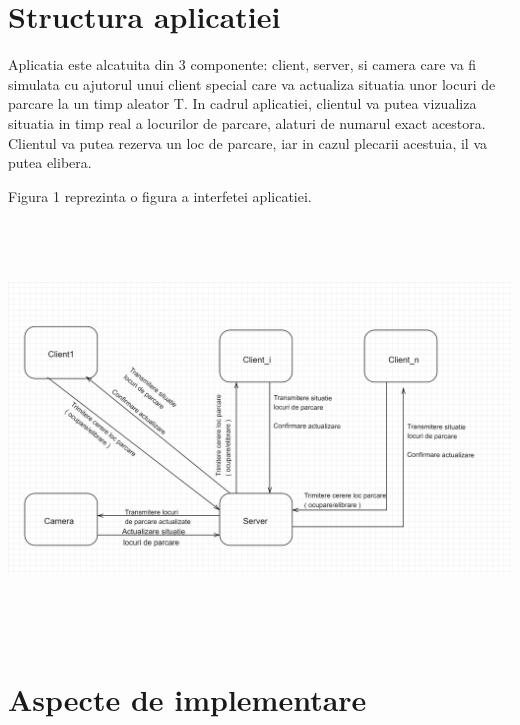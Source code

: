 \documentclass[runningheads]{llncs}
\begin{document}
\section{Structura aplicatiei}

Aplicatia este alcatuita din 3 componente: client, server, si camera care va fi simulata cu ajutorul unui client special care va actualiza situatia unor locuri de parcare la un timp aleator T. In cadrul aplicatiei, clientul va putea vizualiza situatia in timp real a locurilor de parcare, alaturi de numarul exact acestora. Clientul va putea rezerva un loc de parcare, iar in cazul plecarii acestuia, il va putea elibera.

Figura 1 reprezinta o figura a interfetei aplicatiei.
\begin{center}
\includegraphics[width=\linewidth, height=11cm]{fig1.png}
\end{center}

\section{Aspecte de implementare}
\end{document}
